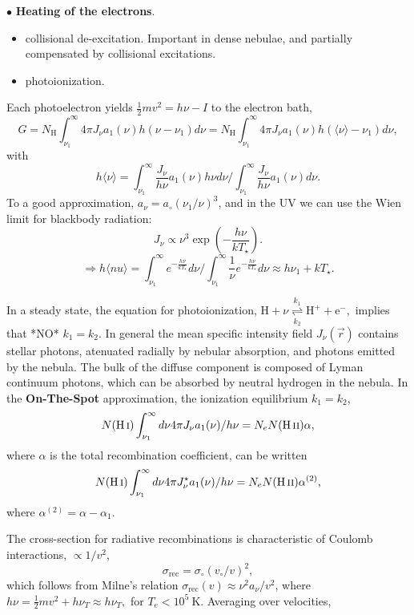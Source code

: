 $\bullet$ {\bf \large Heating of the  electrons}.
\begin{itemize}
\item collisional de-excitation. Important in dense nebulae, and
partially compensated by collisional excitations.
\item photoionization. 
\end{itemize}


Each photoelectron yields $\frac{1}{2} m v^2 = h \nu - I $ to the
electron bath, 
\[ 
G = N_\mathrm{H} \int_{\nu_1}^{\infty} 4 \pi J_\nu a_1(\nu) h (\nu -
\nu_1) d\nu  = N_\mathrm{H} \int_{\nu_1}^{\infty} 4 \pi J_\nu a_1(\nu) h (\langle
\nu \rangle  - \nu_1) d\nu,
\]
with
\[
h\langle \nu \rangle = \int_{\nu_1}^{\infty} \frac{J_\nu}{h\nu}
a_1(\nu) h \nu d\nu  / \int_{\nu_1}^{\infty} \frac{J_\nu}{h\nu} a_1(\nu)  d\nu.
\]
To a good approximation,   $a_\nu = a_\circ (\nu_1/\nu)^3$, and in the
UV we can use the Wien limit for blackbody radiation:
\[
J_\nu  \propto \nu^3 \exp \left( - \frac{h \nu} {k T_\star} \right). 
\]
\[\Rightarrow h \langle nu \rangle = \int_{\nu_1}^{\infty}
e^{-\frac{h\nu}{kT_\star}} d\nu / \int_{\nu_1}^{\infty} \frac{1}{\nu}
e^{-\frac{h\nu}{kT_\star}} d\nu \approx h\nu_1 + k T_\star. \]


In a steady state, the equation for photoionization, $
\mathrm{H} + \nu \overset{k_1}{\underset{k_2}{\rightleftharpoons}}
\mathrm{H}^+ + \mathrm{e}^- , $ implies that *NO* $k_1 = k_2 $. In general
the mean specific intensity field $J_\nu(\vec{r})$ contains stellar
photons, atenuated radially by nebular absorption, and photons emitted
by the nebula. The bulk of the diffuse component is composed of Lyman
continuum photons, which can be absorbed by neutral hydrogen in the
nebula.  In the {\bf On-The-Spot} approximation, the ionization
equilibrium  $k_1 = k_2$,
\[
N(\text{H\,{\sc i}})  \int_{\nu_1}^{\infty} d\nu  4 \pi J_\nu a_1(\nu)  / h
\nu = N_e N(\text{H\,{\sc ii}}) \alpha, 
\]
where  $\alpha$ is the total recombination coefficient, can be written
\[
N(\text{H\,{\sc i}})  \int_{\nu_1}^{\infty} d\nu  4 \pi J^\star_\nu a_1(\nu)  / h
\nu = N_e N(\text{H\,{\sc ii}}) \alpha^{(2)}, 
\]
where $\alpha^{(2)} = \alpha - \alpha_1$.




The cross-section for radiative recombinations is characteristic of
Coulomb interactions,  $\propto 1/v^2$, 
\[
\sigma_\mathrm{rec} = \sigma_\circ (v_\circ/v)^2, 
\]
which follows from Milne's relation $\sigma_\mathrm{rec}(v) \approx \nu^2
a_\nu / v^2$, where $ h \nu = \frac{1}{2} m v^2 + h \nu_T \approx h
\nu_T,$ for $T_e < 10^5~$K.   Averaging over velocities, 

